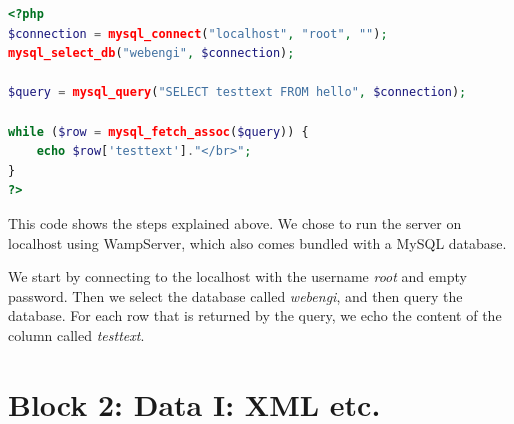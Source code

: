\documentclass[a4paper,12pt]{article}
\begin{document}
\begin{lstlisting}[language=php,label=lst:aspectratio] 
<?php
$connection = mysql_connect("localhost", "root", "");
mysql_select_db("webengi", $connection);

$query = mysql_query("SELECT testtext FROM hello", $connection);

while ($row = mysql_fetch_assoc($query)) {
    echo $row['testtext']."</br>";
}
?>
\end{lstlisting}

This code shows the steps explained above. We chose to run the server on localhost using WampServer, which also comes bundled with a MySQL database.

We start by connecting to the localhost with the username \textit{root} and empty password. Then we select the database called \textit{webengi}, and then query the database. For each row that is returned by the query, we echo the content of the column called \textit{testtext}.

\section{Block 2: Data I: XML etc.}
\end{document}

